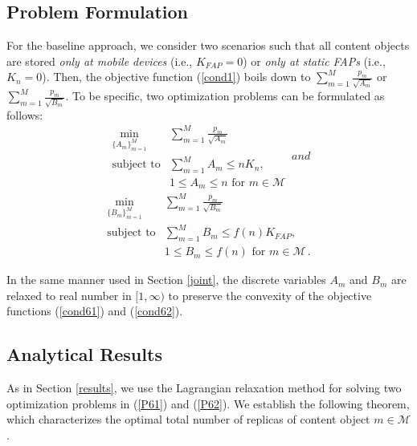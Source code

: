 \documentclass[10pt,journal,compsoc,onecolumn]{IEEEtran}
\begin{document}
\subsection{Problem Formulation}
For the baseline approach, we consider two scenarios such that all
content objects are stored {\em only at mobile devices} (i.e.,
$K_{FAP}=0$) or {\em only at static FAPs} (i.e., $K_n=0$). Then, the objective
function (\ref{cond1}) boils down to $\sum_{m=1}^{M}
\frac{p_m}{\sqrt{A_m}}$ or $\sum_{m=1}^{M}
\frac{p_m}{\sqrt{B_m}}$. To be specific, two optimization problems
can be formulated as follows:
\begin{subequations}
\label{P61}
\begin{align}
    \min_{{\lbrace{A_m\rbrace}}^M_{m=1}}
        & \sum_{m=1}^{M} \frac{p_m}{\sqrt{A_m}}  \label{cond61}\\
    \text{subject to}
        & \sum_{m=1}^{M} A_m \leq nK_n,   \label{6a}\\
        & 1\leq A_m \leq n  \text{ for }  m \in \mathcal{M} \, \label{6c}
\end{align}
and
\end{subequations}
\begin{subequations}
\label{P62}
\begin{align}
    \min_{{\lbrace B_m \rbrace}^M_{m=1}}
        & \sum_{m=1}^{M} \frac{p_m}{\sqrt{B_m}}   \label{cond62}\\
    \text{subject to}
        & \sum_{m=1}^{M} B_m \leq f(n)K_{FAP},  \label{6b}\\
        & 1\leq B_m \leq f(n)   \text{ for }  m \in \mathcal{M} \,. \label{6d}
\end{align}
\end{subequations}

In the same manner used in Section \ref{joint}, the discrete variables $A_m$ and $B_m$ are relaxed to real number in $[1,\infty)$ to preserve the convexity of the objective functions (\ref{cond61}) and (\ref{cond62}).

\subsection{Analytical Results}
As in Section \ref{results}, we use the Lagrangian relaxation method for solving two optimization problems in (\ref{P61}) and (\ref{P62}). We establish the following theorem, which characterizes the optimal total number of replicas of content object $m \in \mathcal{M}$.
\end{document}
